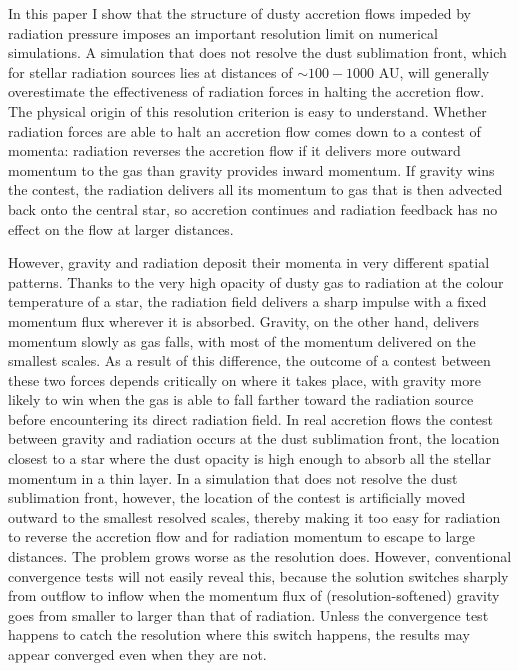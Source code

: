 \documentclass[useAMS,usenatbib]{mn2e}
\begin{document}
In this paper I show that the structure of dusty accretion flows impeded by radiation pressure imposes an important resolution limit on numerical simulations. A simulation that does not resolve the dust sublimation front, which for stellar radiation sources lies at distances of $\sim 100 - 1000$ AU, will generally overestimate the effectiveness of radiation forces in halting the accretion flow. The physical origin of this resolution criterion is easy to understand. Whether radiation forces are able to halt an accretion flow comes down to a contest of momenta: radiation reverses the accretion flow if it delivers more outward momentum to the gas than gravity provides inward momentum. If gravity wins the contest, the radiation delivers all its momentum to gas that is then advected back onto the central star, so accretion continues and radiation feedback has no effect on the flow at larger distances. 

However, gravity and radiation deposit their momenta in very different spatial patterns. Thanks to the very high opacity of dusty gas to radiation at the colour temperature of a star, the radiation field delivers a sharp impulse with a fixed momentum flux wherever it is absorbed. Gravity, on the other hand, delivers momentum slowly as gas falls, with most of the momentum delivered on the smallest scales. As a result of this difference, the outcome of a contest between these two forces depends critically on where it takes place, with gravity more likely to win when the gas is able to fall farther toward the radiation source before encountering its direct radiation field. In real accretion flows the contest between gravity and radiation occurs at the dust sublimation front, the location closest to a star where the dust opacity is high enough to absorb all the stellar momentum in a thin layer. In a simulation that does not resolve the dust sublimation front, however, the location of the contest is artificially moved outward to the smallest resolved scales, thereby making it too easy for radiation to reverse the accretion flow and for radiation momentum to escape to large distances. The problem grows worse as the resolution does. However, conventional convergence tests will not easily reveal this, because the solution switches sharply from outflow to inflow when the momentum flux of (resolution-softened) gravity goes from smaller to larger than that of radiation. Unless the convergence test happens to catch the resolution where this switch happens, the results may appear converged even when they are not.
\end{document}

